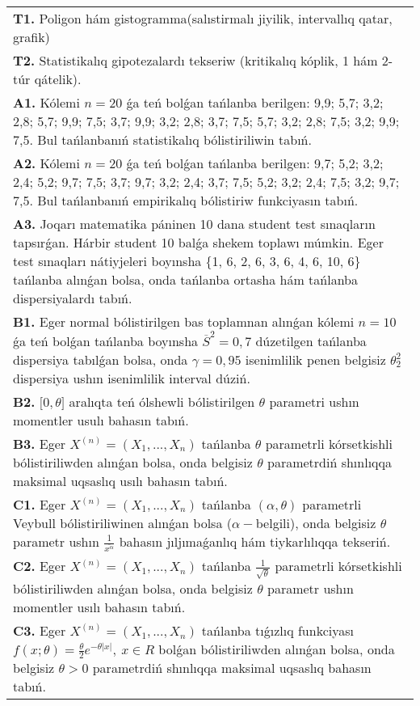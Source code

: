 \documentclass{article}
\begin{document}
\begin{tabular}{m{17cm}}
\textbf{T1.} 
Poligon hám gistogramma(salıstirmalı jiyilik, intervallıq qatar, grafik)
 \\
\textbf{T2.} 
Statistikalıq gipotezalardı tekseriw (kritikalıq kóplik, 1 hám 2-túr qátelik).
 \\
\textbf{A1.} 
Kólemi \(n = 20\) ǵa teń bolǵan tańlanba berilgen: 9,9; 5,7; 3,2; 2,8; 5,7; 9,9; 7,5; 3,7; 9,9; 3,2; 2,8; 3,7; 7,5; 5,7; 3,2; 2,8; 7,5; 3,2; 9,9; 7,5. Bul tańlanbanıń statistikalıq bólistiriliwin tabıń.
 \\
\textbf{A2.} 
Kólemi \(n = 20\) ǵa teń bolǵan tańlanba berilgen: 9,7; 5,2; 3,2; 2,4; 5,2; 9,7; 7,5; 3,7; 9,7; 3,2; 2,4; 3,7; 7,5; 5,2; 3,2; 2,4; 7,5; 3,2; 9,7; 7,5. Bul tańlanbanıń empirikalıq bólistiriw funkciyasın tabıń.
 \\
\textbf{A3.} 
Joqarı matematika páninen 10 dana student test sınaqların tapsırǵan. Hárbir student 10 balǵa shekem toplawı múmkin. Eger test sınaqları nátiyjeleri boyınsha \{1, 6, 2, 6, 3, 6, 4, 6, 10, 6\} tańlanba alınǵan bolsa, onda tańlanba ortasha hám tańlanba dispersiyalardı tabıń.
 \\
\textbf{B1.} 
Eger normal bólistirilgen bas toplamnan alınǵan kólemi \(n = 10\) ǵa teń bolǵan tańlanba boyınsha \({\overline{S}}^{2} = 0,7\) dúzetilgen tańlanba dispersiya tabılǵan bolsa, onda \(\gamma = 0,95\) isenimlilik penen belgisiz \(\theta_{2}^{2}\) dispersiya ushın isenimlilik interval dúziń.
 \\
\textbf{B2.} 
\(\lbrack 0,\theta\rbrack\) aralıqta teń ólshewli bólistirilgen \(\theta\) parametri ushın momentler usulı bahasın tabıń.
 \\
\textbf{B3.} 
Eger \(X^{(n)} = \left( X_{1},...,X_{n} \right)\) tańlanba \(\theta\) parametrli kórsetkishli bólistiriliwden alınǵan bolsa, onda belgisiz \(\theta\) parametrdiń shınlıqqa maksimal uqsaslıq usılı bahasın tabıń.
 \\
\textbf{C1.} 
Eger \(X^{(n)} = \left( X_{1},...,X_{n} \right)\) tańlanba \((\alpha,\theta)\) parametrli Veybull bólistiriliwinen alınǵan bolsa (\(\alpha -\)belgili), onda belgisiz \(\theta\) parametr ushın \(\frac{1}{\overline{x^{\alpha}}}\) bahasın jıljımaǵanlıq hám tiykarlılıqqa tekseriń.
 \\
\textbf{C2.} 
Eger \(X^{(n)} = \left( X_{1},...,X_{n} \right)\) tańlanba \(\frac{1}{\sqrt{\theta}}\) parametrli kórsetkishli bólistiriliwden alınǵan bolsa, onda belgisiz \(\theta\) parametr ushın momentler usılı bahasın tabıń.
 \\
\textbf{C3.} 
Eger \(X^{(n)} = \left( X_{1},...,X_{n} \right)\) tańlanba tıǵızlıq funkciyası
$f(x;\theta) = \frac{\theta}{2}e^{- \theta|x|},\ x \in R$
bolǵan bólistiriliwden alınǵan bolsa, onda belgisiz \(\theta > 0\) parametrdiń shınlıqqa maksimal uqsaslıq bahasın tabıń.
 \\

\end{tabular}
\vspace{1cm}
\end{document}

